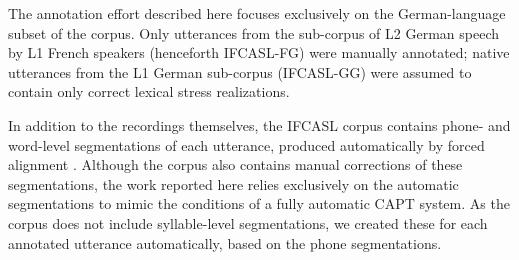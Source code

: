 \documentclass[a4paper]{article}
\newcommand{\TODO}[1]{{\color{red}\textbf{[TODO #1]}}}
\begin{document}
	The annotation effort described here focuses exclusively on the German-language subset of the corpus. Only utterances from the sub-corpus of L2 German speech by L1 French speakers (henceforth IFCASL-FG) were manually annotated; native utterances from the L1 German sub-corpus (IFCASL-GG) were assumed to contain only correct lexical stress realizations.
%	
	
	In addition to the recordings themselves, the IFCASL corpus contains phone- and word-level segmentations of each utterance, produced automatically by forced alignment \cite{Fauth2014}. Although the corpus also contains manual corrections of these segmentations, the work reported here relies exclusively on the automatic segmentations to 
	{\color{blue} mimic}
	the conditions of a fully automatic 
	CAPT system. %
	As the corpus does not include syllable-level segmentations,
	we created these for each annotated utterance automatically, based on the phone segmentations.
		
\end{document}
